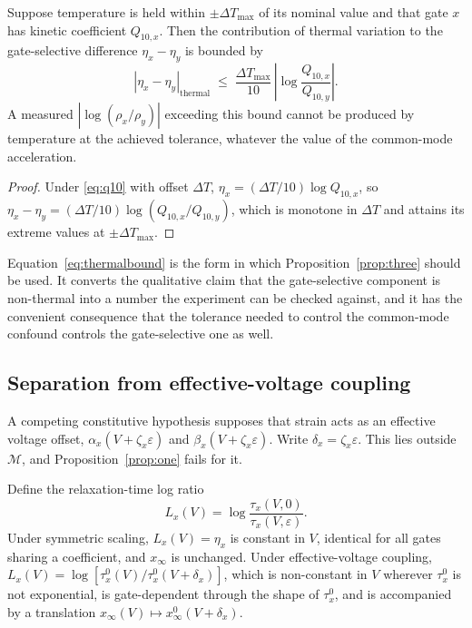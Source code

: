 \begin{corollary}
\label{cor:three}
Suppose temperature is held within $\pm\Delta T_{\max}$ of its nominal value and
that gate $x$ has kinetic coefficient $Q_{10,x}$. Then the contribution of
thermal variation to the gate-selective difference $\eta_x-\eta_y$ is bounded by
\begin{equation}
\left|\eta_x-\eta_y\right|_{\mathrm{thermal}}
\;\le\; \frac{\Delta T_{\max}}{10}\,
\left|\log\frac{Q_{10,x}}{Q_{10,y}}\right|.
\label{eq:thermalbound}
\end{equation}
A measured $\left|\log(\rho_x/\rho_y)\right|$ exceeding this bound cannot be
produced by temperature at the achieved tolerance, whatever the value of the
common-mode acceleration.
\end{corollary}

\begin{proof}
Under \eqref{eq:q10} with offset $\Delta T$, $\eta_x=(\Delta T/10)\log Q_{10,x}$,
so $\eta_x-\eta_y=(\Delta T/10)\log(Q_{10,x}/Q_{10,y})$, which is monotone in
$\Delta T$ and attains its extreme values at $\pm\Delta T_{\max}$.
\end{proof}

\noindent Equation~\eqref{eq:thermalbound} is the form in which Proposition~\ref{prop:three}
should be used. It converts the qualitative claim that the gate-selective
component is non-thermal into a number the experiment can be checked against,
and it has the convenient consequence that the tolerance needed to control the
common-mode confound controls the gate-selective one as well.

\subsection{Separation from effective-voltage coupling}

A competing constitutive hypothesis supposes that strain acts as an effective
voltage offset, $\alpha_x(V+\zeta_x\varepsilon)$ and
$\beta_x(V+\zeta_x\varepsilon)$. Write $\delta_x=\zeta_x\varepsilon$. This lies
outside $\mathcal{M}$, and Proposition~\ref{prop:one} fails for it.

\begin{proposition}
\label{prop:four}
Define the relaxation-time log ratio
\begin{equation}
L_x(V)=\log\frac{\tau_x(V,0)}{\tau_x(V,\varepsilon)}.
\label{eq:L}
\end{equation}
Under symmetric scaling, $L_x(V)=\eta_x$ is constant in $V$, identical for all
gates sharing a coefficient, and $x_\infty$ is unchanged. Under effective-voltage
coupling, $L_x(V)=\log\left[\tau_x^0(V)/\tau_x^0(V+\delta_x)\right]$, which is
non-constant in $V$ wherever $\tau_x^0$ is not exponential, is gate-dependent
through the shape of $\tau_x^0$, and is accompanied by a translation
$x_\infty(V)\mapsto x_\infty^0(V+\delta_x)$.
\end{proposition}

